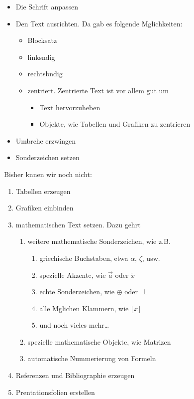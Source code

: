 \documentclass[11pt,a4paper]{article} %
\begin{document}
\begin{itemize}
 \item Die Schrift anpassen
 \item Den Text ausrichten. Da gab es folgende Mglichkeiten:
    \begin{itemize}
        \item Blocksatz
        \item linksndig
        \item rechtsbndig
        \item zentriert. Zentrierte Text ist vor allem gut um
            \begin{itemize}
                \item Text hervorzuheben
                \item Objekte, wie Tabellen und Grafiken zu zentrieren
            \end{itemize}
    \end{itemize}
 \item Umbrche erzwingen
 \item Sonderzeichen setzen
\end{itemize}

Bisher knnen wir noch nicht:

\begin{enumerate}
 \item Tabellen erzeugen
 \item Grafiken einbinden
 \item mathematischen Text setzen. Dazu gehrt
    \begin{enumerate}
       \item weitere mathematische Sonderzeichen, wie z.B.
           \begin{enumerate}
               \item griechische Buchstaben, etwa $\alpha$, $\zeta$, usw.
               \item spezielle Akzente, wie $\vec{a}$ oder $\ddot{x}$
               \item echte Sonderzeichen, wie $\oplus$ oder $\perp$
               \item alle Mglichen Klammern, wie $\lfloor x \rfloor$
               \item und noch vieles mehr\ldots
           \end{enumerate}
       \item spezielle mathematische Objekte, wie Matrizen
       \item automatische Nummerierung von Formeln
    \end{enumerate}
 \item Referenzen und Bibliographie erzeugen
 \item Prentationsfolien erstellen
\end{enumerate}
\end{document}
